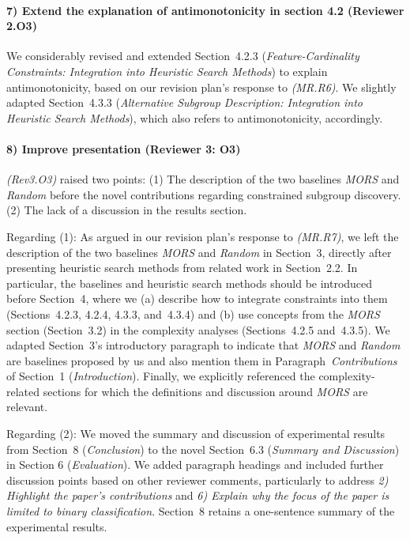 \documentclass{article}
\begin{document}
\paragraph{7) Extend the explanation of antimonotonicity in section 4.2 (Reviewer 2.O3)}

We considerably revised and extended Section~4.2.3 (\emph{Feature-Cardinality Constraints: Integration into Heuristic Search Methods}) to explain antimonotonicity, based on our revision plan's response to \emph{(MR.R6)}.
We slightly adapted Section~4.3.3 (\emph{Alternative Subgroup Description: Integration into Heuristic Search Methods}), which also refers to antimonotonicity, accordingly.

\paragraph{8) Improve presentation (Reviewer 3: O3)}

\emph{(Rev3.O3)} raised two points:
(1) The description of the two baselines \emph{MORS} and \emph{Random} before the novel contributions regarding constrained subgroup discovery.
(2) The lack of a discussion in the results section.

Regarding (1):
As argued in our revision plan's response to \emph{(MR.R7)}, we left the description of the two baselines \emph{MORS} and \emph{Random} in Section~3, directly after presenting heuristic search methods from related work in Section~2.2.
In particular, the baselines and heuristic search methods should be introduced before Section~4, where we (a) describe how to integrate constraints into them (Sections~4.2.3, 4.2.4, 4.3.3, and~4.3.4) and (b) use concepts from the \emph{MORS} section (Section~3.2) in the complexity analyses (Sections~4.2.5 and~4.3.5).
We adapted Section~3's introductory paragraph to indicate that \emph{MORS} and \emph{Random} are baselines proposed by us and also mention them in Paragraph~\emph{Contributions} of Section~1 (\emph{Introduction}).
Finally, we explicitly referenced the complexity-related sections for which the definitions and discussion around \emph{MORS} are relevant.

Regarding (2):
We moved the summary and discussion of experimental results from Section~8 (\emph{Conclusion}) to the novel Section~6.3 (\emph{Summary and Discussion}) in Section 6 (\emph{Evaluation}).
We added paragraph headings and included further discussion points based on other reviewer comments, particularly to address \emph{2) Highlight the paper’s contributions} and \emph{6) Explain why the focus of the paper is limited to binary classification}.
Section~8 retains a one-sentence summary of the experimental results.

\printbibliography
\end{document}

